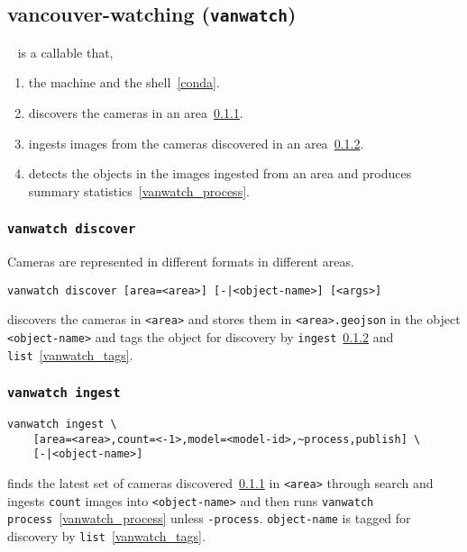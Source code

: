 \subsection{vancouver-watching (\texttt{vanwatch})}\label{vanwatch}

~\cite{vanwatch} is a callable that,
%
\begin{enumerate}
    \item{ the machine and the shell~\ref{conda}.}
    \item{discovers the cameras in an area~\ref{vanwatch_discover}.}
    \item{ingests images from the cameras discovered in an area~\ref{vanwatch_ingest}.}
    \item{detects the objects in the images ingested from an area and produces summary statistics~\ref{vanwatch_process}.}
\end{enumerate}

\subsubsection{\texttt{vanwatch discover}}\label{vanwatch_discover}

Cameras are represented in different formats in different areas.
%
\begin{verbatim}
vanwatch discover [area=<area>] [-|<object-name>] [<args>]
\end{verbatim}
%
discovers the cameras in \texttt{<area>} and stores them in \texttt{<area>.geojson} in the object \texttt{<object-name>} and tags the object for discovery by \texttt{ingest}~\ref{vanwatch_ingest} and \texttt{list}~\ref{vanwatch_tags}. 

\subsubsection{\texttt{vanwatch ingest}}\label{vanwatch_ingest}

\begin{verbatim}
vanwatch ingest \
    [area=<area>,count=<-1>,model=<model-id>,~process,publish] \
    [-|<object-name>]
\end{verbatim}
%
finds the latest set of cameras discovered~\ref{vanwatch_discover} in \texttt{<area>} through  search and ingests \texttt{count} images into \texttt{<object-name>} and then runs \texttt{vanwatch process}~\ref{vanwatch_process} unless \texttt{-process}. \texttt{object-name} is tagged for discovery by \texttt{list}~\ref{vanwatch_tags}. 

